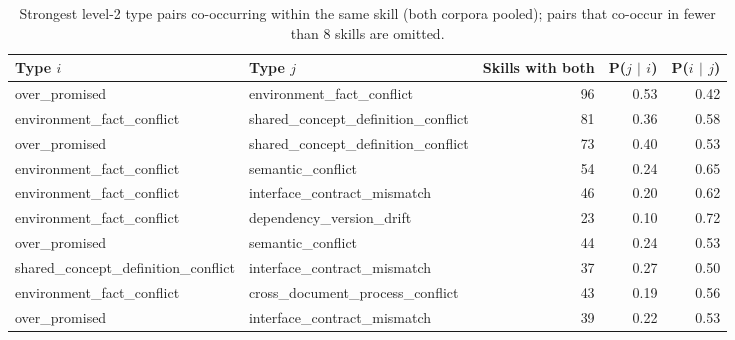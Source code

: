 \begin{table}[t]
  \centering
  \caption{Strongest level-2 type pairs co-occurring within the same skill (both corpora pooled); pairs that co-occur in fewer than 8 skills are omitted.}
  \label{tab:rq1-cooccurrence-pairs}
  \footnotesize
  \setlength{\tabcolsep}{4pt}

  \begin{tabular}{llrrr}
    \toprule
    Type $i$ & Type $j$ & Skills with both & P($j$ $\mid$ $i$) & P($i$ $\mid$ $j$) \\
    \midrule
    over\_promised & environment\_fact\_conflict & 96 & 0.53 & 0.42 \\
    environment\_fact\_conflict & shared\_concept\_definition\_conflict & 81 & 0.36 & 0.58 \\
    over\_promised & shared\_concept\_definition\_conflict & 73 & 0.40 & 0.53 \\
    environment\_fact\_conflict & semantic\_conflict & 54 & 0.24 & 0.65 \\
    environment\_fact\_conflict & interface\_contract\_mismatch & 46 & 0.20 & 0.62 \\
    environment\_fact\_conflict & dependency\_version\_drift & 23 & 0.10 & 0.72 \\
    over\_promised & semantic\_conflict & 44 & 0.24 & 0.53 \\
    shared\_concept\_definition\_conflict & interface\_contract\_mismatch & 37 & 0.27 & 0.50 \\
    environment\_fact\_conflict & cross\_document\_process\_conflict & 43 & 0.19 & 0.56 \\
    over\_promised & interface\_contract\_mismatch & 39 & 0.22 & 0.53 \\
    \bottomrule
  \end{tabular}
\end{table}
